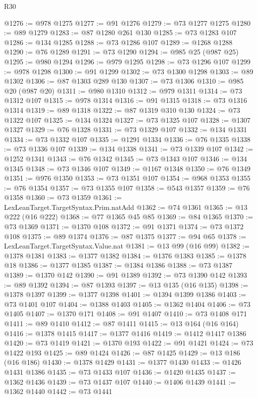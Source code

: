 \begin{lexlean}{R30}
\begin{coremodule}
{{{{{@1276 := @978 @1275
@1277 := @91 @1276
@1279 := @73 @1277 @1275
@1280 := @89 @1279
@1283 := @87 @1280 @261 @130
@1285 := @73 @1283 @107
@1286 := @134 @1285
@1288 := @73 @1286 @107
@1289 := @1268 @1288
@1290 := @76 @1289
@1291 := @73 @1290
@1294 := @985 @25 (@987 @25)
@1295 := @980 @1294
@1296 := @979 @1295
@1298 := @73 @1296 @107
@1299 := @978 @1298
@1300 := @91 @1299
@1302 := @73 @1300 @1298
@1303 := @89 @1302
@1306 := @87 @1303 @289 @130
@1307 := @73 @1306
@1310 := @985 @20 (@987 @20)
@1311 := @980 @1310
@1312 := @979 @1311
@1314 := @73 @1312 @107
@1315 := @978 @1314
@1316 := @91 @1315
@1318 := @73 @1316 @1314
@1319 := @89 @1318
@1322 := @87 @1319 @310 @130
@1324 := @73 @1322 @107
@1325 := @134 @1324
@1327 := @73 @1325 @107
@1328 := @1307 @1327
@1329 := @76 @1328
@1331 := @73 @1329 @107
@1332 := @134 @1331
@1334 := @73 @1332 @107
@1335 := @1291 @1334
@1336 := @76 @1335
@1338 := @73 @1336 @107
@1339 := @134 @1338
@1341 := @73 @1339 @107
@1342 := @1252 @1341
@1343 := @76 @1342
@1345 := @73 @1343 @107
@1346 := @134 @1345
@1348 := @73 @1346 @107
@1349 := @1167 @1348
@1350 := @76 @1349
@1351 := @976 @1350
@1353 := @73 @1351 @107
@1354 := @968 @1353
@1355 := @76 @1354
@1357 := @73 @1355 @107
@1358 := @543 @1357
@1359 := @76 @1358
@1360 := @73 @1359
@1361 := LexLeanTarget.TargetSyntax.Prim.natAdd
@1362 := @74 @1361
@1365 := @13 @222 (@16 @222)
@1368 := @77 @1365 @45 @85
@1369 := @84 @1365
@1370 := @73 @1369
@1371 := @1370 @108
@1372 := @91 @1371
@1374 := @73 @1372 @108
@1375 := @89 @1374
@1376 := @87 @1375
@1377 := @94 @65
@1378 := LexLeanTarget.TargetSyntax.Value.nat
@1381 := @13 @99 (@16 @99)
@1382 := @1378 @1381
@1383 := @1377 @1382
@1384 := @1376 @1383
@1385 := @1378 @18
@1386 := @1377 @1385
@1387 := @1384 @1386
@1388 := @73 @1387
@1389 := @1370 @142
@1390 := @91 @1389
@1392 := @73 @1390 @142
@1393 := @89 @1392
@1394 := @87 @1393
@1397 := @13 @135 (@16 @135)
@1398 := @1378 @1397
@1399 := @1377 @1398
@1401 := @1394 @1399 @1386
@1403 := @73 @1401 @107
@1404 := @1388 @1403
@1405 := @1362 @1404
@1406 := @73 @1405
@1407 := @1370 @171
@1408 := @91 @1407
@1410 := @73 @1408 @171
@1411 := @89 @1410
@1412 := @87 @1411
@1415 := @13 @164 (@16 @164)
@1416 := @1378 @1415
@1417 := @1377 @1416
@1419 := @1412 @1417 @1386
@1420 := @73 @1419
@1421 := @1370 @193
@1422 := @91 @1421
@1424 := @73 @1422 @193
@1425 := @89 @1424
@1426 := @87 @1425
@1429 := @13 @186 (@16 @186)
@1430 := @1378 @1429
@1431 := @1377 @1430
@1433 := @1426 @1431 @1386
@1435 := @73 @1433 @107
@1436 := @1420 @1435
@1437 := @1362 @1436
@1439 := @73 @1437 @107
@1440 := @1406 @1439
@1441 := @1362 @1440
@1442 := @73 @1441
}}}}}
\end{coremodule}
\end{lexlean}
